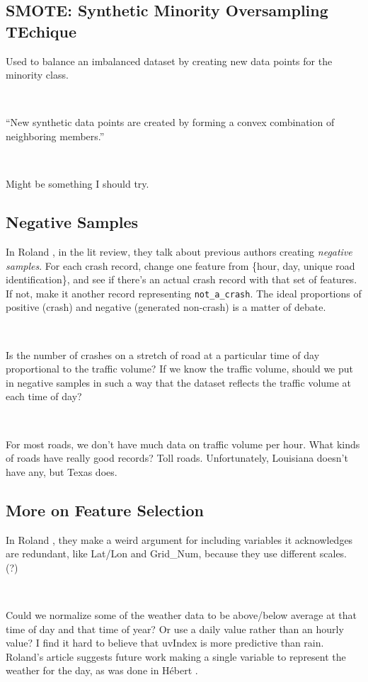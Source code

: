 \documentclass[11pt]{article}
\begin{document}
\begin{spacing}{1.2}
\subsection{SMOTE:  Synthetic Minority Oversampling TEchique}

Used to balance an imbalanced dataset by creating new data points for the minority class.  

\

``New synthetic data points are created by forming a convex combination of neighboring members.'' \cite{PARSA2019202}

\

Might be something I should try.  

\subsection{Negative Samples}

In Roland \cite{ ROLAND2021105860}, in the lit review, they talk about previous authors creating {\it negative samples}.  For each crash record, change one feature from \{hour, day, unique road identification\}, and see if there's an actual crash record with that set of features.  If not, make it another record representing \verb|not_a_crash|.  The ideal proportions of positive (crash) and negative (generated non-crash) is a matter of debate.  

\

Is the number of crashes on a stretch of road at a particular time of day proportional to the traffic volume?  If we know the traffic volume, should we put in negative samples in such a way that the dataset reflects the traffic volume at each time of day?

\

For most roads, we don't have much data on traffic volume per hour.  What kinds of roads have really good records?  Toll roads.  Unfortunately, Louisiana doesn't have any, but Texas does.  


\subsection{More on Feature Selection}

In Roland \cite{ ROLAND2021105860}, they make a weird argument for including variables it acknowledges are redundant, like Lat/Lon and Grid\_Num, because they use different scales.  (?)

\

Could we normalize some of the weather data to be above/below average at that time of day and that time of year?  Or use a daily value rather than an hourly value?  I find it hard to believe that uvIndex is more predictive than rain.  Roland's article suggests future work making a single variable to represent the weather for the day, as was done in H\'ebert \cite{Hebert_2019}.


\end{spacing}
\end{document}
